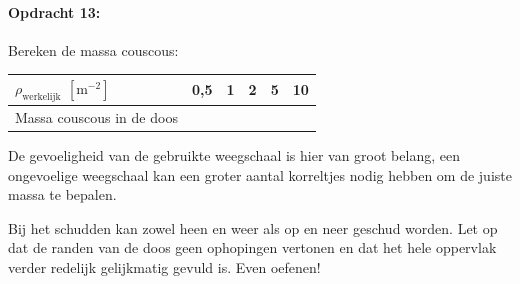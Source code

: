 \bigskip{}


\begin{minipage}[t]{1\columnwidth}%

\paragraph{Opdracht 13:}

Bereken de massa couscous:\smallskip{}

\begin{tabular}{|x{.3\textwidth}|x{.1\textwidth}|x{.1\textwidth}
                |x{.1\textwidth}|x{.1\textwidth}|x{.1\textwidth}|}
    \hline 
    $\rho_\textrm{werkelijk}$ $\left[\mathrm{m^{-2}}\right]$ & 0,5 & 1 & 2 & 5 & 10 \\
    \hline 
    Massa couscous in de doos &  &  &  &  & \\
    \hline 
\end{tabular}

\smallskip{}


De gevoeligheid van de gebruikte weegschaal is hier van groot belang,
een ongevoelige weegschaal kan een groter aantal korreltjes nodig
hebben om de juiste massa te bepalen.%
\end{minipage}

\bigskip{}


Bij het schudden kan zowel heen en weer als op en neer geschud worden.
Let op dat de randen van de doos geen ophopingen vertonen en dat het
hele oppervlak verder redelijk gelijkmatig gevuld is. Even oefenen!

\bigskip{}


